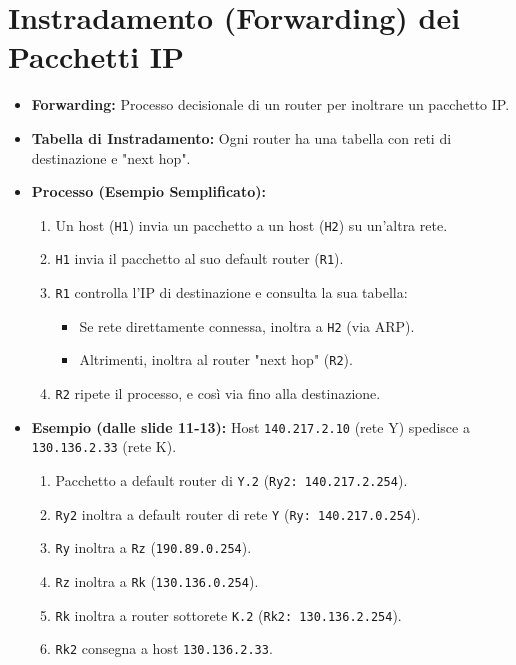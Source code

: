 \section{Instradamento (Forwarding) dei Pacchetti IP}
\begin{itemize}
    \item \textbf{Forwarding:} Processo decisionale di un router per inoltrare un pacchetto IP.
    \item \textbf{Tabella di Instradamento:} Ogni router ha una tabella con reti di destinazione e "next hop".
    \item \textbf{Processo (Esempio Semplificato):}
    \begin{enumerate}
        \item Un host (\texttt{H1}) invia un pacchetto a un host (\texttt{H2}) su un'altra rete.
        \item \texttt{H1} invia il pacchetto al suo default router (\texttt{R1}).
        \item \texttt{R1} controlla l'IP di destinazione e consulta la sua tabella:
        \begin{itemize}
            \item Se rete direttamente connessa, inoltra a \texttt{H2} (via ARP).
            \item Altrimenti, inoltra al router "next hop" (\texttt{R2}).
        \end{itemize}
        \item \texttt{R2} ripete il processo, e così via fino alla destinazione.
    \end{enumerate}
    \item \textbf{Esempio (dalle slide 11-13):} Host \texttt{140.217.2.10} (rete Y) spedisce a \texttt{130.136.2.33} (rete K).
    \begin{enumerate}
        \item Pacchetto a default router di \texttt{Y.2} (\texttt{Ry2: 140.217.2.254}).
        \item \texttt{Ry2} inoltra a default router di rete \texttt{Y} (\texttt{Ry: 140.217.0.254}).
        \item \texttt{Ry} inoltra a \texttt{Rz} (\texttt{190.89.0.254}).
        \item \texttt{Rz} inoltra a \texttt{Rk} (\texttt{130.136.0.254}).
        \item \texttt{Rk} inoltra a router sottorete \texttt{K.2} (\texttt{Rk2: 130.136.2.254}).
        \item \texttt{Rk2} consegna a host \texttt{130.136.2.33}.
    \end{enumerate}
\end{itemize}

